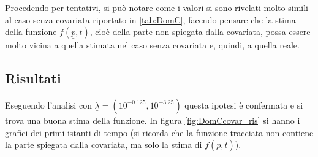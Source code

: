 \documentclass[a4paper,11pt,twoside,openright]{book}							%
\begin{document}
Procedendo per tentativi, si può notare come i valori si sono rivelati molto simili al caso senza covariata riportato in \ref{tab:DomC}, facendo pensare che la stima della funzione $f(\underline p,t)$, cioè della parte non spiegata dalla covariata, possa essere molto vicina a quella stimata nel caso senza covariata e, quindi, a quella reale.

\subsection{Risultati}
Eseguendo l'analisi con $\underline \lambda = (10^{-0.125}, 10^{-3.25})$ questa ipotesi è confermata e si trova una buona stima della funzione. In figura \ref{fig:DomCcovar_ris} si hanno i grafici dei primi istanti di tempo (si ricorda che la funzione tracciata non contiene la parte spiegata dalla covariata, ma solo la stima di $f(\underline p,t)$). 
\newpage
\end{document}
